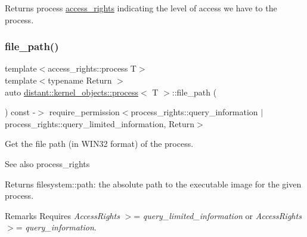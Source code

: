 \begin{DoxyReturn}{Returns}
process \mbox{\hyperlink{structdistant_1_1access__rights}{access\+\_\+rights}} indicating the level of access we have to the process. 
\end{DoxyReturn}
\mbox{\label{classdistant_1_1kernel__objects_1_1process_abf8afdafb3ff75722ea2660aac7a7b22}} 
\subsubsection{\texorpdfstring{file\+\_\+path()}{file\_path()}}
{\footnotesize\ttfamily template$<$access\+\_\+rights\+::process T$>$ \\
template$<$typename Return $>$ \\
auto \mbox{\hyperlink{classdistant_1_1kernel__objects_1_1process}{distant\+::kernel\+\_\+objects\+::process}}$<$ T $>$\+::file\+\_\+path (\begin{DoxyParamCaption}{ }\end{DoxyParamCaption}) const -\/$>$ require\+\_\+permission$<$process\+\_\+rights\+::query\+\_\+information $\vert$ process\+\_\+rights\+::query\+\_\+limited\+\_\+information, Return$>$}



Get the file path (in W\+I\+N32 format) of the process. 

\begin{DoxySeeAlso}{See also}
process\+\_\+rights 
\end{DoxySeeAlso}
\begin{DoxyReturn}{Returns}
filesystem\+::path\+: the absolute path to the executable image for the given process. 
\end{DoxyReturn}
\begin{DoxyRemark}{Remarks}
Requires {\itshape Access\+Rights} $>$= {\itshape query\+\_\+limited\+\_\+information} or {\itshape Access\+Rights} $>$= {\itshape query\+\_\+information}. 
\end{DoxyRemark}
\mbox{\label{classdistant_1_1kernel__objects_1_1process_a4db8ac7a1b08736c7b862862b02106c3}} 
